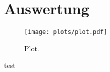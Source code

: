\section{Auswertung}
\label{sec:Auswertung}

\begin{figure}
  \centering
  \texttt{[image: plots/plot.pdf]}
  \caption{Plot.}
  \label{fig:plot}
\end{figure}
test


